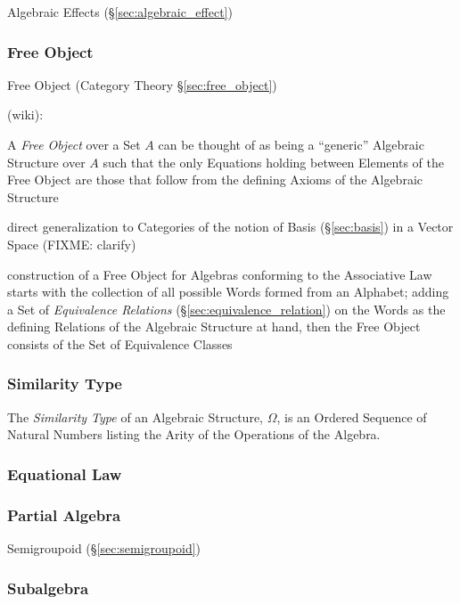 Algebraic Effects (\S\ref{sec:algebraic_effect})



\subsubsection{Free Object}\label{sec:universal_free_object}

\fist Free Object (Category Theory \S\ref{sec:free_object})

(wiki):

A \emph{Free Object} over a Set $A$ can be thought of as being a ``generic''
Algebraic Structure over $A$ such that the only Equations holding between
Elements of the Free Object are those that follow from the defining Axioms of
the Algebraic Structure

direct generalization to Categories of the notion of Basis (\S\ref{sec:basis})
in a Vector Space (FIXME: clarify)

construction of a Free Object for Algebras conforming to the Associative Law
starts with the collection of all possible Words formed from an Alphabet; adding
a Set of \emph{Equivalence Relations} (\S\ref{sec:equivalence_relation}) on the
Words as the defining Relations of the Algebraic Structure at hand, then the
Free Object consists of the Set of Equivalence Classes



\subsubsection{Similarity Type}\label{sec:similarity_type}

The \emph{Similarity Type} of an Algebraic Structure, $\Omega$, is an Ordered
Sequence of Natural Numbers listing the Arity of the Operations of the Algebra.



\subsubsection{Equational Law}\label{sec:equational_law}

\subsubsection{Partial Algebra}\label{sec:partial_algebra}

Semigroupoid (\S\ref{sec:semigroupoid})



\subsubsection{Subalgebra}\label{sec:subalgebra}

